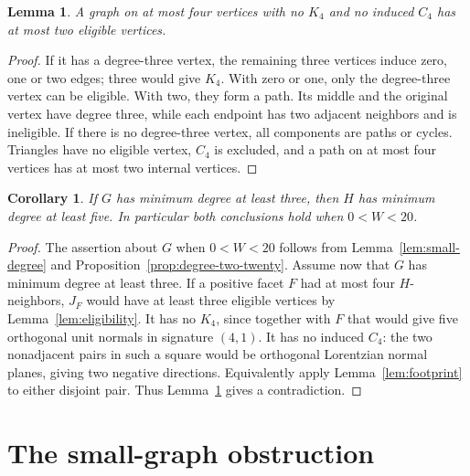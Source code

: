 \documentclass[11pt]{article}
\newtheorem{lemma}[theorem]{Lemma}
\newtheorem{corollary}[theorem]{Corollary}
\theoremstyle{remark}
\begin{document}
\begin{lemma}\label{lem:four-graph}
A graph on at most four vertices with no $K_4$ and no induced $C_4$
has at most two eligible vertices.
\end{lemma}
\begin{proof}
If it has a degree-three vertex, the remaining three vertices induce
zero, one or two edges; three would give $K_4$. With zero or one,
only the degree-three vertex can be eligible. With two, they form a
path. Its middle and the original vertex have degree three, while
each endpoint has two adjacent neighbors and is ineligible. If there
is no degree-three vertex, all components are paths or cycles.
Triangles have no eligible vertex, $C_4$ is excluded, and a path on
at most four vertices has at most two internal vertices.
\end{proof}

\begin{corollary}\label{cor:min-degree}
If $G$ has minimum degree at least three, then $H$ has minimum degree
at least five. In particular both conclusions hold when $0<W<20$.
\end{corollary}
\begin{proof}
The assertion about $G$ when $0<W<20$ follows from
Lemma~\ref{lem:small-degree} and Proposition~\ref{prop:degree-two-twenty}.
Assume now that $G$ has minimum degree at least three. If a positive
facet $F$ had at most four $H$-neighbors, $J_F$ would have at least
three eligible vertices by Lemma~\ref{lem:eligibility}. It has no
$K_4$, since together with $F$ that would give five orthogonal unit
normals in signature $(4,1)$. It has no induced $C_4$: the two
nonadjacent pairs in such a square would be orthogonal Lorentzian
normal planes, giving two negative directions. Equivalently apply
Lemma~\ref{lem:footprint} to either disjoint pair. Thus
Lemma~\ref{lem:four-graph} gives a contradiction.
\end{proof}

\section{The small-graph obstruction}
\end{document}
